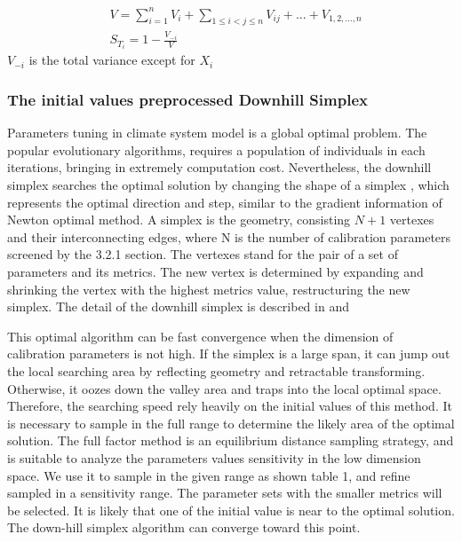 \documentclass[gmd, manuscript]{copernicus}
\begin{document}
\begin{align}
& V = \sum_{i=1}^n V_i + \sum_{1 \leq i < j \leq n} V_{ij} + ... + V_{1,2,...,n}  \\
& S_{T_i} = 1 - \frac{V_{-i}}{V} 
\end{align}
$V_{-i}$ is the total variance except for $X_i$

\subsubsection{The initial values preprocessed Downhill Simplex}

Parameters tuning in climate system model is a global optimal problem. The popular evolutionary 
algorithms, requires a population of individuals in each iterations, bringing in extremely 
computation cost. Nevertheless, the downhill simplex searches the optimal solution by changing the 
shape of a simplex , which represents the optimal direction and step, similar to the gradient 
information of Newton optimal method. A simplex is 
the geometry, consisting $N+1$ vertexes and their interconnecting edges, where N is the number of 
calibration parameters screened by the 3.2.1 section. The vertexes stand for the pair of a set of 
parameters and its metrics. The new vertex is determined by expanding and shrinking the vertex 
with the highest metrics value, restructuring the new simplex. The detail of the downhill simplex 
is described in \cite{press1992numerical} and \cite{nelder1965simplex}

This optimal algorithm can be fast convergence when the dimension of calibration parameters is not high. If the simplex is a large span, it can jump out the local searching area by reflecting geometry and retractable transforming. Otherwise, it oozes down the valley area and traps into the local optimal space. Therefore, the searching speed rely heavily on the initial values of this method. It is necessary to sample in the full range to determine the likely area of the optimal solution. The full factor method
is an equilibrium distance sampling strategy, and is suitable to analyze the parameters values
sensitivity in the low dimension space. We use it to sample in the given range as shown table 1,
and refine sampled in a sensitivity range. The parameter sets with the smaller metrics will be
selected. It is likely that one of the initial value is near to the optimal solution. The down-hill
simplex algorithm can converge toward this point.
\end{document}
